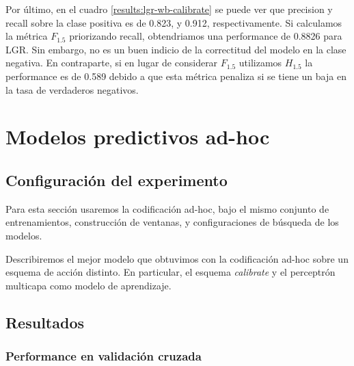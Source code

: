 Por último, en el cuadro \ref{results:lgr-wb-calibrate} se puede ver que
precision y recall sobre la clase positiva es de 0.823, y 0.912,
respectivamente. Si calculamos la métrica $F_{1.5}$ priorizando recall,
obtendriamos una performance de 0.8826 para LGR. Sin embargo, no es un buen
indicio de la correctitud del modelo en la clase negativa. En contraparte, si en
lugar de considerar $F_{1.5}$ utilizamos $H_{1.5}$ la performance es de 0.589
debido a que esta métrica penaliza si se tiene un baja en la tasa de verdaderos
negativos.


\begin{table}[t!]
\centering
{}
 \caption{Métricas sobre el conjunto de test del modelo de LGR con word embeddings.}
 \label{results:lgr-wb-calibrate}
\end{table}

\section{Modelos predictivos ad-hoc}
\label{exp:wb}

\subsection{Configuración del experimento}

Para esta sección usaremos la codificación ad-hoc, bajo el mismo conjunto de
entrenamientos, construcción de ventanas, y configuraciones de búsqueda de los
modelos.

Describiremos el mejor modelo que obtuvimos con la codificación ad-hoc sobre un
esquema de acción distinto. En particular, el esquema \emph{calibrate} y el
perceptrón multicapa como modelo de aprendizaje.

\subsection{Resultados}

\subsubsection{Performance en validación cruzada}

